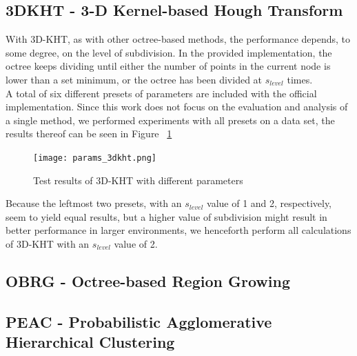 \documentclass[main.tex]{subfiles}
\begin{document}
\subsection*{3DKHT - 3-D Kernel-based Hough Transform}
With 3D-KHT, as with other octree-based methods, the performance depends, to some degree, on the level of subdivision.
In the provided implementation, the octree keeps dividing until either the number of points in the current node is lower than a set minimum, or the
octree has been divided at $s_{level}$ times.\\
A total of six different presets of parameters are included with the official implementation.
Since this work does not focus on the evaluation and analysis of a single method, we performed experiments with all presets on a data set, the
results thereof can be seen in Figure ~\ref{fig:3dkht_params}

\begin{figure}[!h]
    \centering
    \texttt{[image: params\_3dkht.png]}
    \caption{Test results of 3D-KHT with different parameters}
    \label{fig:3dkht_params}
\end{figure}

Because the leftmost two presets, with an $s_{level}$ value of 1 and 2, respectively, seem to yield equal results, but a higher value of subdivision
might result in better performance in larger environments, we henceforth perform all calculations of 3D-KHT with an $s_{level}$ value of 2.

\subsection*{OBRG - Octree-based Region Growing}
\subsection*{PEAC - Probabilistic Agglomerative Hierarchical Clustering}
\end{document}
